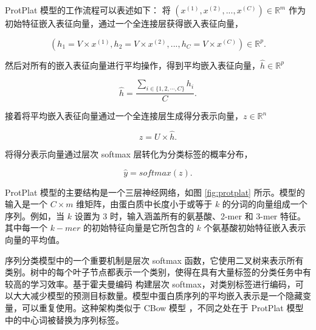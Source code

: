 ProtPlat 模型的工作流程可以表述如下：
将 $(x^{(1)}, x^{(2)}, ..., x^{(C)}) \in \mathbb{R}^{m}$ 作为初始特征嵌入表征向量，通过一个全连接层获得嵌入表征向量，

\begin{equation}
    (h_1 = V \times x^{(1)}, h_2 = V \times x^{(2)},...,h_C = V \times x^{(C)}) \in \mathbb {R}^{p}.
\end{equation}

然后对所有的嵌入表征向量进行平均操作，得到平均嵌入表征向量，$\hat{h} \in \mathbb{R}^{p}$

\begin{equation}
    \hat{h} = \frac{\sum_{i\in \{1,2,\cdots, C\}} h_i}{C}. 
\end{equation}

接着将平均嵌入表征向量通过一个全连接层生成得分表示向量，$z \in \mathbb{R}^{n} $

\begin{equation}
    z = U \times \hat{h}.
\end{equation}

将得分表示向量通过层次 softmax 层转化为分类标签的概率分布，

\begin{equation}
    \hat{y} = softmax(z).
\end{equation}

ProtPlat 模型的主要结构是一个三层神经网络，如图 \ref{fig:protplat} 所示。模型的输入是一个 $C \times m$ 维矩阵，由蛋白质中长度小于或等于 $k$ 的分词的向量组成一个序列。例如，当 $k$ 设置为 3 时，输入涵盖所有的氨基酸、2-mer 和 3-mer 特征。其中每一个 $k-mer$ 的初始特征向量是它所包含的 $k$ 个氨基酸初始特征嵌入表示向量的平均值。

序列分类模型中的一个重要机制是层次 softmax 函数，它使用二叉树来表示所有类别。树中的每个叶子节点都表示一个类别，使得在具有大量标签的分类任务中有较高的学习效率。基于霍夫曼编码 \cite{han2015deep} 构建层次 softmax，对类别标签进行编码，可以大大减少模型的预测目标数量。模型中蛋白质序列的平均嵌入表示是一个隐藏变量，可以重复使用。这种架构类似于 CBow 模型 \cite{mikolov2013distributed}，不同之处在于 ProtPlat 模型中的中心词被替换为序列标签。


